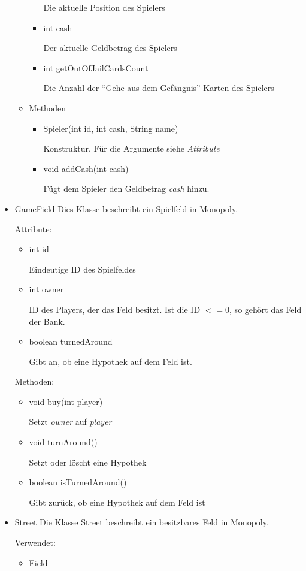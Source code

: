 \documentclass[a4paper,10pt]{article}
\begin{document}
\begin{itemize}
\begin{itemize}
\begin{itemize}
Die aktuelle Position des Spielers
\item int cash

Der aktuelle Geldbetrag des Spielers
\item int getOutOfJailCardsCount

Die Anzahl der "`Gehe aus dem Gefängnis"'-Karten des Spielers
\end{itemize}
\item Methoden
\begin{itemize}
\item Spieler(int id, int cash, String name)

Konstruktur. Für die Argumente siehe \textit{Attribute}
\item void addCash(int cash)

Fügt dem Spieler den Geldbetrag \textit{cash} hinzu.
\end{itemize}
\end{itemize}

\item GameField
Dies Klasse beschreibt ein Spielfeld in Monopoly.

Attribute:
\begin{itemize}
\item int id

Eindeutige ID des Spielfeldes
\item int owner

ID des Players, der das Feld besitzt. Ist die ID $<= 0$, so gehört das Feld der Bank.
\item boolean turnedAround

Gibt an, ob eine Hypothek auf dem Feld ist.
\end{itemize}
Methoden:
\begin{itemize}
\item void buy(int player)

Setzt \textit{owner} auf \textit{player}
\item void turnAround()

Setzt oder löscht eine Hypothek
\item boolean isTurnedAround()

Gibt zurück, ob eine Hypothek auf dem Feld ist
\end{itemize}

\item Street
Die Klasse Street beschreibt ein besitzbares Feld in Monopoly.

Verwendet:
\begin{itemize}
\item Field
\end{itemize}


\end{itemize}
\end{document}
